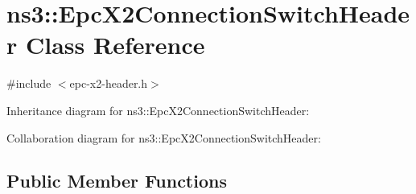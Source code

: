 \hypertarget{classns3_1_1EpcX2ConnectionSwitchHeader}{}\section{ns3\+:\+:Epc\+X2\+Connection\+Switch\+Header Class Reference}
\label{classns3_1_1EpcX2ConnectionSwitchHeader}


{\ttfamily \#include $<$epc-\/x2-\/header.\+h$>$}



Inheritance diagram for ns3\+:\+:Epc\+X2\+Connection\+Switch\+Header\+:


Collaboration diagram for ns3\+:\+:Epc\+X2\+Connection\+Switch\+Header\+:
\subsection*{Public Member Functions}
